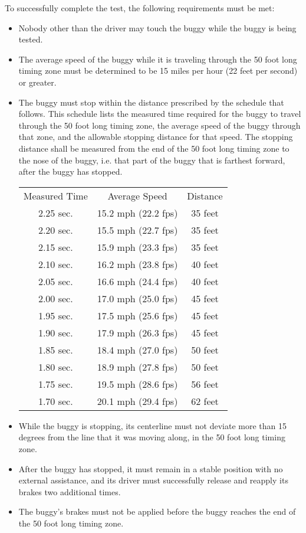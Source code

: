 	\noindent To successfully complete the test, the following requirements must be met:

	\begin{itemize}

		\item
		Nobody other than the driver may touch the buggy while the buggy is being
		tested.

		\item
		The average speed of the buggy while it is traveling through the 50 foot long
		timing zone must be determined to be 15 miles per hour (22 feet per second) or
		greater.

		\item
		The buggy must stop within the distance prescribed by the schedule that
		follows. This schedule lists the measured time required for the buggy to travel
		through the 50 foot long timing zone, the average speed of the buggy through
		that zone, and the allowable stopping distance for that speed. The stopping
		distance shall be measured from the end of the 50 foot long timing zone to the
		nose of the buggy, i.e. that part of the buggy that is farthest forward, after
		the buggy has stopped.

			\begin{tabular}{c c c}
				Measured Time & Average Speed & Distance \\
				2.25 sec. & 15.2 mph (22.2 fps) & 35 feet\\
				2.20 sec. & 15.5 mph (22.7 fps) & 35 feet\\
				2.15 sec. & 15.9 mph (23.3 fps) & 35 feet\\
				2.10 sec. & 16.2 mph (23.8 fps) & 40 feet\\
				2.05 sec. & 16.6 mph (24.4 fps) & 40 feet\\
				2.00 sec. & 17.0 mph (25.0 fps) & 45 feet\\
				1.95 sec. & 17.5 mph (25.6 fps) & 45 feet\\
				1.90 sec. & 17.9 mph (26.3 fps) & 45 feet\\
				1.85 sec. & 18.4 mph (27.0 fps) & 50 feet\\
				1.80 sec. & 18.9 mph (27.8 fps) & 50 feet\\
				1.75 sec. & 19.5 mph (28.6 fps) & 56 feet\\
				1.70 sec. & 20.1 mph (29.4 fps) & 62 feet\\
			\end{tabular}

		\item
		While the buggy is stopping, its centerline must not deviate more than 15
		degrees from the line that it was moving along, in the 50 foot long timing
		zone.

		\item
		After the buggy has stopped, it must remain in a stable position with no
		external assistance, and its driver must successfully release and reapply its
		brakes two additional times.

		\item
		The buggy's brakes must not be applied before the buggy reaches the end of the
		50 foot long timing zone.

	\end{itemize}

